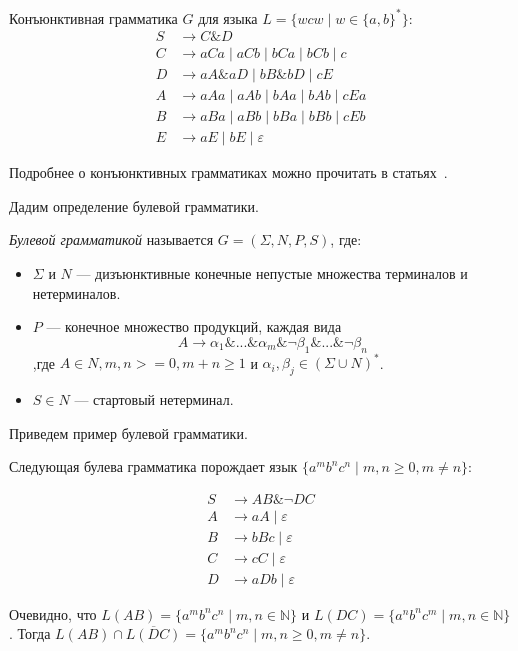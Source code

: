 \begin{example}
    Конъюнктивная грамматика $G$ для языка $L = \{wcw \mid w \in \{a, b\}^*\}$:
    \begin{align*}
    S &\to C \& D \\ 
    C &\to aCa \mid aCb \mid bCa \mid bCb \mid c \\ 
    D &\to aA\&aD \mid bB\&bD \mid cE \\
    A &\to aAa \mid aAb \mid bAa \mid bAb \mid cEa \\
    B &\to aBa \mid aBb \mid bBa \mid bBb \mid cEb \\
    E &\to aE \mid bE \mid \varepsilon
    \end{align*}
\end{example}

Подробнее о конъюнктивных грамматиках можно прочитать в статьях~\cite{DBLP:journals/jalc/Okhotin01, Okhotin2002, DBLP:journals/tcs/Okhotin03a, f60a33d409364914be560cac0e54b12c}.

Дадим определение булевой грамматики.

\begin{definition}
    \textit{Булевой грамматикой} называется $G = (\Sigma,N,P,S)$, где:
    \begin{itemize}
        \item $\Sigma$ и $N$ --- дизъюнктивные конечные непустые множества терминалов и нетерминалов.
        \item $P$ --- конечное множество продукций, каждая вида
        \[
        A\rightarrow \alpha_1\&...\&\alpha_m\&\neg\beta_1\&...\&\neg\beta_n
        \]
        ,где $A \in N, m, n >=0, m+n \geq 1$ и $\alpha_i,\beta_j \in (\Sigma \cup N)^*$.
        \item $S \in N$  --- стартовый нетерминал.
    \end{itemize}
\end{definition}

Приведем пример булевой грамматики.

\begin{example}
    Следующая булева грамматика порождает язык  $\{a^mb^nc^n\mid m,n \geq 0, m \neq n \}$:
    
    \begin{align*}
    S   &\to A B \& \neg D C \\ 
    A  &\to a A \mid \varepsilon \\ 
    B &\to b B c \mid \varepsilon \\
    C   &\to c C \mid \varepsilon \\ 
    D   &\to aDb \mid \varepsilon
    \end{align*}
    
    Очевидно, что $L(AB) = \{a^mb^nc^n\mid m,n \in \mathbb{N}\}$ и $L(DC) = \{a^nb^nc^m\mid m,n \in \mathbb{N}\}$. Тогда $L(AB)\cap\overline{L(DC)} = \{a^mb^nc^n\mid m,n \geq 0, m \neq n \}$.
\end{example}

